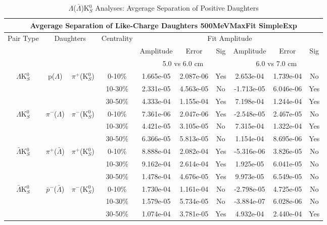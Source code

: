 \documentclass[../AnalysisNoteJBuxton.tex]{subfiles}
\begin{document}
\begin{table}
 \centering
 \begin{tabular}{|c|c|c|c|c|c|c||c|c|c|}
 \multicolumn{10}{c}{Avgerage Separation of Like-Charge Daughters 500MeVMaxFit SimpleExp} \\
  \hline
  \multirow{3}{*}{Pair Type} & \multicolumn{2}{c|}{\multirow{3}{*}{Daughters}} & \multirow{3}{*}{Centrality} & \multicolumn{6}{c|}{Fit Amplitude} \\
  \cline{5-10}
   & \multicolumn{2}{c|}{} & & Amplitude & Error & Sig & Amplitude & Error & Sig \\  
  \cline{5-10}
   & \multicolumn{2}{c|}{} & & \multicolumn{3}{c||}{5.0 vs 6.0 cm} & \multicolumn{3}{c|}{6.0 vs 7.0 cm} \\  
  \hline
  \multirow{3}{*}{$\Lambda$K$^{0}_{S}$} & \multirow{3}{*}{p($\Lambda$)} & \multirow{3}{*}{$\pi^{+}$(K$^{0}_{S}$)}
   &      0-10\% & 1.665e-05 & 2.087e-06 & Yes & 2.653e-04 & 1.739e-04 & No \\
   & & & 10-30\% & 2.331e-05 & 4.563e-05 & No & -1.713e-05 & 6.046e-06 & Yes \\
   & & & 30-50\% & 4.333e-04 & 1.155e-04 & Yes & 7.198e-04 & 1.244e-04 & Yes \\
  \hline
  \multirow{3}{*}{$\Lambda$K$^{0}_{S}$} & \multirow{3}{*}{$\pi^{-}$($\Lambda$)} & \multirow{3}{*}{$\pi^{-}$(K$^{0}_{S}$) }
   &      0-10\% & 7.361e-06 & 2.047e-06 & Yes & -2.548e-05 & 2.467e-05 & No \\
   & & & 10-30\% & 4.421e-05 & 3.105e-05 & No & 7.315e-04 & 1.322e-04 & Yes \\
   & & & 30-50\% & 6.366e-05 & 5.813e-05 & No & 1.154e-04 & 8.695e-06 & Yes \\
  \hline \hline
  \multirow{3}{*}{$\bar{\Lambda}$K$^{0}_{S}$} & \multirow{3}{*}{$\pi^{+}$($\bar{\Lambda}$)} & \multirow{3}{*}{$\pi^{+}$(K$^{0}_{S}$)} 
   &      0-10\% & 8.888e-04 & 2.082e-04 & Yes & -5.316e-06 & 3.826e-05 & No \\
   & & & 10-30\% & 9.162e-04 & 2.614e-04 & Yes & 1.925e-05 & 6.041e-05 & No \\
   & & & 30-50\% & 1.478e-04 & 4.676e-05 & Yes & 9.973e-05 & 6.549e-05 & No \\
  \hline
  \multirow{3}{*}{$\bar{\Lambda}$K$^{0}_{S}$} & \multirow{3}{*}{$\bar{p}^{-}$($\bar{\Lambda}$)} & \multirow{3}{*}{$\pi^{-}$(K$^{0}_{S}$)}
   &      0-10\% & 1.730e-04 & 1.161e-04 & No & -2.798e-05 & 4.725e-05 & No \\
   & & & 10-30\% & 1.579e-05 & 5.734e-05 & No & -3.884e-07 & 6.028e-06 & No \\
   & & & 30-50\% & 1.074e-04 & 3.781e-05 & Yes & 4.932e-04 & 2.440e-04 & Yes \\
  \hline
 \end{tabular}
 \caption{$\Lambda$($\bar{\Lambda}$)K$^{0}_{S}$ Analyses: Avgerage Separation of Positive Daughters}
 \label{tab:AvgSepLamK0_500MeVMaxFit_SimpleExp}
\end{table}

\end{document}
